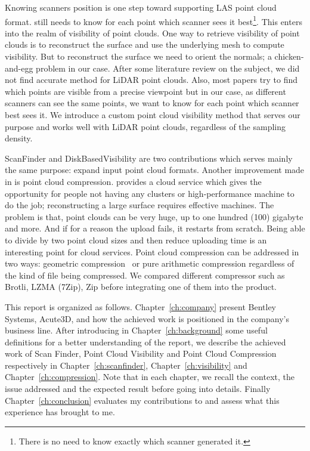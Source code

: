 Knowing scanners position is one step toward supporting LAS point cloud format. \CC still needs to know for each point which scanner sees it best\footnote{There is no need to know exactly which scanner generated it.}. This enters into the realm of visibility of point clouds. One way to retrieve visibility of point clouds is to reconstruct the surface and use the underlying mesh to compute visibility. But to reconstruct the surface we need to orient the normals; a chicken-and-egg problem in our case. After some literature review on the subject, we did not find accurate method for LiDAR point clouds. Also, most papers try to find which points are visible from a precise viewpoint but in our case, as different scanners can see the same points, we want to know for each point which scanner best sees it. We introduce a custom point cloud visibility method that serves our purpose and works well with LiDAR point clouds, regardless of the sampling density.

ScanFinder and DiskBasedVisibility are two contributions which serves mainly the same purpose: expand \CC input point cloud formats. Another improvement made in \CC is point cloud compression. \CC provides a cloud service which gives the opportunity for people not having any clusters or high-performance machine to do the job; reconstructing a large surface requires effective machines. The problem is that, point clouds can be very huge, up to one hundred (100) gigabyte and more. And if for a reason the upload fails, it restarts from scratch. Being able to divide by two point cloud sizes and then reduce uploading time is an interesting point for \CC cloud services. Point cloud compression can be addressed in two ways: geometric compression~\cite{compress1, compress2} or pure arithmetic compression regardless of the kind of file being compressed. We compared different compressor such as Brotli, LZMA (7Zip), Zip before integrating one of them into the product.

This report is organized as follows. Chapter~\ref{ch:company} present Bentley Systems, Acute3D, \CC and how the achieved work is positioned in the company's business line. After introducing in Chapter~\ref{ch:background} some useful definitions for a better understanding of the report, we describe the achieved work of Scan Finder, Point Cloud Visibility and Point Cloud Compression respectively in Chapter~\ref{ch:scanfinder}, Chapter~\ref{ch:visibility} and
Chapter~\ref{ch:compression}. Note that in each chapter, we recall the context, the issue addressed and the expected result before going into details. Finally Chapter~\ref{ch:conclusion} evaluates my contributions to \CC and assess what this experience has brought to me.
